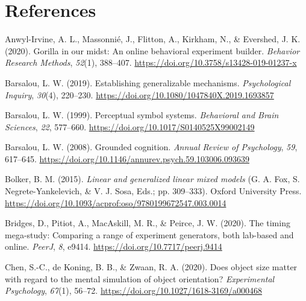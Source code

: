 \documentclass[
  man,floatsintext]{apa7}
\newlength{\cslhangindent}
\newlength{\cslentryspacingunit} %
\newenvironment{CSLReferences}[2] %
 {%
  \setlength{\parindent}{0pt}
  \ifodd #1
  \let\oldpar\par
  \def\par{\hangindent=\cslhangindent\oldpar}
  \fi
  \setlength{\parskip}{#2\cslentryspacingunit}
 }%
 {}
\begin{document}
\newpage

\hypertarget{references}{%
\section{References}\label{references}}

\hypertarget{refs}{}
\begin{CSLReferences}{1}{0}
\leavevmode{}%
Anwyl-Irvine, A. L., Massonnié, J., Flitton, A., Kirkham, N., \& Evershed, J. K. (2020). Gorilla in our midst: {An} online behavioral experiment builder. \emph{Behavior Research Methods}, \emph{52}(1), 388--407. \url{https://doi.org/10.3758/s13428-019-01237-x}

\leavevmode{}%
Barsalou, L. W. (2019). Establishing generalizable mechanisms. \emph{Psychological Inquiry}, \emph{30}(4), 220--230. \url{https://doi.org/10.1080/1047840X.2019.1693857}

\leavevmode{}%
Barsalou, L. W. (1999). Perceptual symbol systems. \emph{Behavioral and Brain Sciences}, \emph{22}, 577--660. \url{https://doi.org/10.1017/S0140525X99002149}

\leavevmode{}%
Barsalou, L. W. (2008). Grounded cognition. \emph{Annual Review of Psychology}, \emph{59}, 617--645. \url{https://doi.org/10.1146/annurev.psych.59.103006.093639}

\leavevmode{}%
Bolker, B. M. (2015). \emph{Linear and generalized linear mixed models} (G. A. Fox, S. Negrete-Yankelevich, \& V. J. Sosa, Eds.; pp. 309--333). Oxford University Press. \url{https://doi.org/10.1093/acprof:oso/9780199672547.003.0014}

\leavevmode{}%
Bridges, D., Pitiot, A., MacAskill, M. R., \& Peirce, J. W. (2020). The timing mega-study: Comparing a range of experiment generators, both lab-based and online. \emph{PeerJ}, \emph{8}, e9414. \url{https://doi.org/10.7717/peerj.9414}

\leavevmode{}%
Chen, S.-C., de Koning, B. B., \& Zwaan, R. A. (2020). Does object size matter with regard to the mental simulation of object orientation? \emph{Experimental Psychology}, \emph{67}(1), 56--72. \url{https://doi.org/10.1027/1618-3169/a000468}


\end{CSLReferences}
\end{document}
